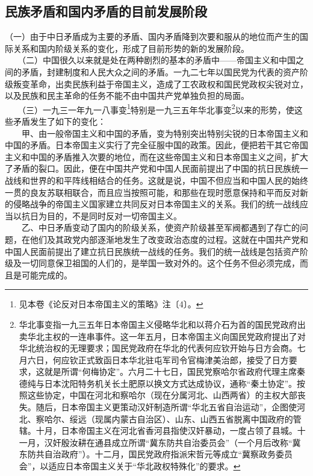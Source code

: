 \documentclass[cn,11pt,chinese]{elegantbook}
\def\myformat#1{\hfil\hfil #1}
\begin{document}
\subsection*{\myformat{民族矛盾和国内矛盾的目前发展阶段 }}
（一）由于中日矛盾成为主要的矛盾、国内矛盾降到次要和服从的地位而产生的国际关系和国内阶级关系的变化，形成了目前形势的新的发展阶段。\\
　　（二）中国很久以来就是处在两种剧烈的基本的矛盾中——帝国主义和中国之间的矛盾，封建制度和人民大众之间的矛盾。一九二七年以国民党为代表的资产阶级叛变革命，出卖民族利益于帝国主义，造成了工农政权和国民党政权尖锐对立，以及民族和民主革命的任务不能不由中国共产党单独负担的局面。\\
　　（三）一九三一年九一八事变\footnote[1]{ 见本卷《论反对日本帝国主义的策略》注〔4〕。}特别是一九三五年华北事变\footnote[2]{ 华北事变指一九三五年日本帝国主义侵略华北和以蒋介石为首的国民党政府出卖华北主权的一连串事件。这一年五月，日本帝国主义向国民党政府提出了对华北统治权的无理要求；国民党政府在华北的代表何应钦开始与日方会商。七月六日，何应钦正式致函日本华北驻屯军司令官梅津美治郎，接受了日方要求，这就是所谓“何梅协定”。六月二十七日，国民党察哈尔省政府代理主席秦德纯与日本沈阳特务机关长土肥原以换文方式达成协议，通称“秦土协定”。按照这些协定，中国在河北和察哈尔（现在分属河北、山西两省）的主权大部丧失。随后，日本帝国主义更策动汉奸制造所谓“华北五省自治运动”，企图使河北、察哈尔、绥远（现属内蒙古自治区）、山东、山西五省脱离中国政府的管辖。十月，日本帝国主义在河北省香河县指使汉奸暴动，一度占领了县城。十一月，汉奸殷汝耕在通县成立所谓“冀东防共自治委员会”（一个月后改称“冀东防共自治政府”）。十二月，国民党政府指派宋哲元等成立“冀察政务委员会”，以适应日本帝国主义关于“华北政权特殊化”的要求。}以来的形势，使这些矛盾发生了如下的变化：\\
　　甲、由一般帝国主义和中国的矛盾，变为特别突出特别尖锐的日本帝国主义和中国的矛盾。日本帝国主义实行了完全征服中国的政策。因此，便把若干其它帝国主义和中国的矛盾推入次要的地位，而在这些帝国主义和日本帝国主义之间，扩大了矛盾的裂口。因此，便在中国共产党和中国人民面前提出了中国的抗日民族统一战线和世界的和平阵线相结合的任务。这就是说，中国不但应当和中国人民的始终一贯的良友苏联相联合，而且应当按照可能，和那些在现时愿意保持和平而反对新的侵略战争的帝国主义国家建立共同反对日本帝国主义的关系。我们的统一战线应当以抗日为目的，不是同时反对一切帝国主义。\\
　　乙、中日矛盾变动了国内的阶级关系，使资产阶级甚至军阀都遇到了存亡的问题，在他们及其政党内部逐渐地发生了改变政治态度的过程。这就在中国共产党和中国人民面前提出了建立抗日民族统一战线的任务。我们的统一战线是包括资产阶级及一切同意保卫祖国的人们的，是举国一致对外的。这个任务不但必须完成，而且是可能完成的。\\
\end{document}
